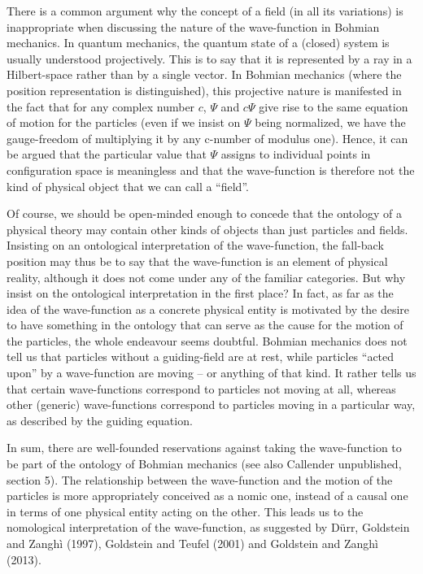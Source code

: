 \documentclass[12pt]{article}
\theoremstyle{definition}
\begin{document}
There is a common argument why the concept of a field (in all its variations) is inappropriate when discussing the nature of the wave-function in Bohmian mechanics. In quantum mechanics, the quantum state of a (closed) system is usually understood projectively. This is to say that it is represented by a ray in a Hilbert-space rather than by a single vector. In Bohmian mechanics (where the position representation is distinguished), this projective nature is manifested in the fact that for any complex number $c$, $\Psi$ and $c\Psi$ give rise to the same equation of motion for the particles (even if we insist on $\Psi$ being normalized, we have the gauge-freedom of multiplying it by any c-number of modulus one). Hence, it can be argued that the particular value that $\Psi$ assigns to individual points in configuration space is meaningless and that the wave-function is therefore not the kind of physical object that we can call a ``field''.

Of course, we should be open-minded enough to concede that the ontology of a physical theory may contain other kinds of objects than just particles and fields. Insisting on an ontological interpretation of the wave-function, the fall-back position may thus be to say that the wave-function is an element of physical reality, although it does not come under any of the familiar categories. But why insist on the ontological interpretation in the first place? In fact, as far as the idea of the wave-function as a concrete physical entity is motivated by the desire to have something in the ontology that can serve as the cause for the motion of the particles, the whole endeavour seems doubtful. Bohmian mechanics does not tell us that particles without a guiding-field are at rest, while particles ``acted upon'' by a wave-function are moving -- or anything of that kind. It rather tells us that certain wave-functions correspond to particles not moving at all, whereas other (generic) wave-functions correspond to particles moving in a particular way, as described by the guiding equation.

In sum, there are well-founded reservations against taking the wave-function to be part of the ontology of Bohmian mechanics (see also Callender unpublished, section 5). The relationship between the wave-function and the motion of the particles is more appropriately conceived as a nomic one, instead of a causal one in terms of one physical entity acting on the other. This leads us to the nomological interpretation of the wave-function, as suggested by D\"urr, Goldstein and Zangh\`i (1997), Goldstein and Teufel (2001) and Goldstein and Zangh\`i (2013).
\end{document}
